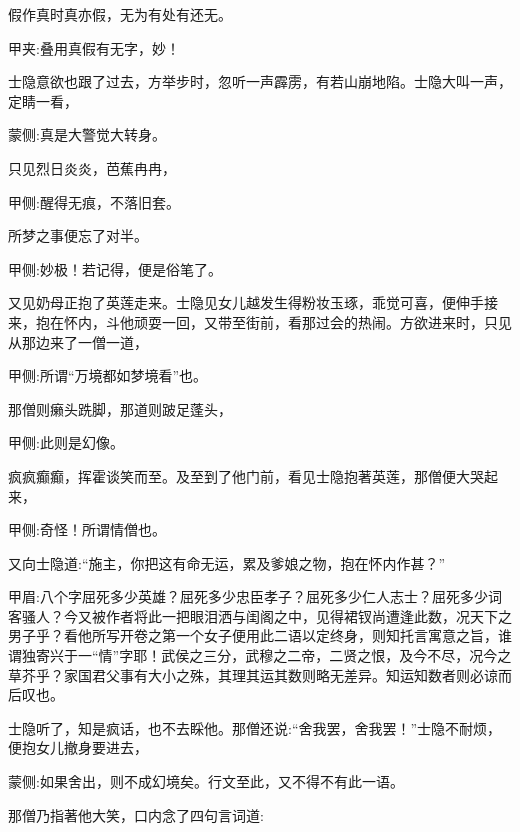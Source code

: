 \begin{poem}
    \begin{pl}假作真时真亦假，无为有处有还无。\end{pl}
    \begin{note}甲夹:叠用真假有无字，妙！\end{note}
\end{poem}


\begin{parag}
    士隐意欲也跟了过去，方举步时，忽听一声霹雳，有若山崩地陷。士隐大叫一声，定睛一看，\begin{note}蒙侧:真是大警觉大转身。\end{note}只见烈日炎炎，芭蕉冉冉，\begin{note}甲侧:醒得无痕，不落旧套。\end{note}所梦之事便忘了对半。\begin{note}甲侧:妙极！若记得，便是俗笔了。\end{note}
\end{parag}


\begin{parag}
    又见奶母正抱了英莲走来。士隐见女儿越发生得粉妆玉琢，乖觉可喜，便伸手接来，抱在怀内，斗他顽耍一回，又带至街前，看那过会的热闹。方欲进来时，只见从那边来了一僧一道，\begin{note}甲侧:所谓“万境都如梦境看”也。\end{note}那僧则癞头跣脚，那道则跛足蓬头，\begin{note}甲侧:此则是幻像。\end{note}疯疯癫癫，挥霍谈笑而至。及至到了他门前，看见士隐抱著英莲，那僧便大哭起来，\begin{note}甲侧:奇怪！所谓情僧也。\end{note}又向士隐道:“施主，你把这有命无运，累及爹娘之物，抱在怀内作甚？”\begin{note}甲眉:八个字屈死多少英雄？屈死多少忠臣孝子？屈死多少仁人志士？屈死多少词客骚人？今又被作者将此一把眼泪洒与闺阁之中，见得裙钗尚遭逢此数，况天下之男子乎？看他所写开卷之第一个女子便用此二语以定终身，则知托言寓意之旨，谁谓独寄兴于一“情”字耶！武侯之三分，武穆之二帝，二贤之恨，及今不尽，况今之草芥乎？家国君父事有大小之殊，其理其运其数则略无差异。知运知数者则必谅而后叹也。\end{note}士隐听了，知是疯话，也不去睬他。那僧还说:“舍我罢，舍我罢！”士隐不耐烦，便抱女儿撤身要进去，\begin{note}蒙侧:如果舍出，则不成幻境矣。行文至此，又不得不有此一语。\end{note}那僧乃指著他大笑，口内念了四句言词道:
\end{parag}


